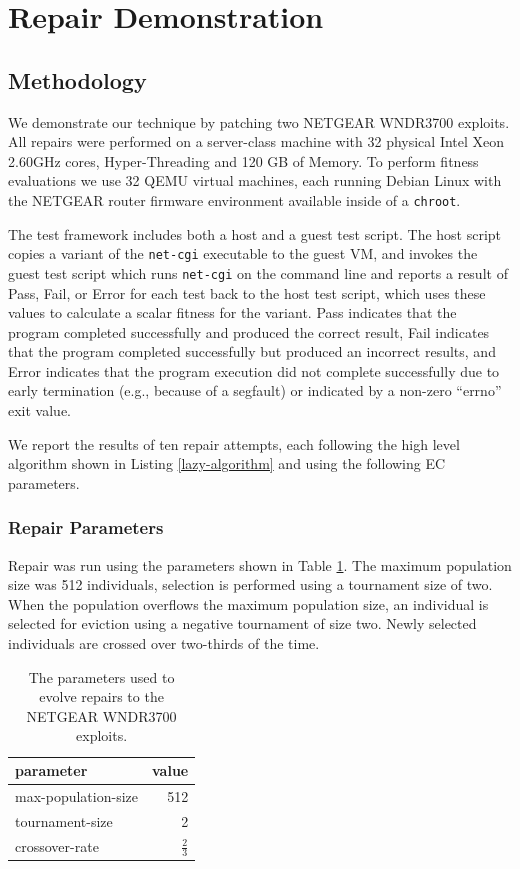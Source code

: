 \documentclass{sigcomm-alternate}
\begin{document}
\section{Repair Demonstration}
\label{sec-4}
\subsection{Methodology}
\label{sec-4-1}
We demonstrate our technique by patching two NETGEAR WNDR3700
exploits.  All repairs were performed on a server-class machine with
32 physical Intel Xeon 2.60GHz cores, Hyper-Threading and 120 GB of
Memory.  To perform fitness evaluations we use 32 QEMU virtual
machines, each running Debian Linux with the NETGEAR router firmware
environment available inside of a \texttt{chroot}.

The test framework includes both a host and a guest test script.  The
host script copies a variant of the \texttt{net-cgi} executable to the guest
VM, and invokes the guest test script which runs \texttt{net-cgi} on the
command line and reports a result of {\sc Pass}, {\sc Fail}, or 
{\sc Error} for each test back to the host test script, which uses these
values to calculate a scalar fitness for the variant.  {\sc Pass}
indicates that the program completed successfully and produced the correct
result, {\sc Fail} indicates that the program completed successfully
but produced an incorrect results, and {\sc Error} indicates that the
program execution did not complete successfully due to early
termination (e.g., because of a segfault) or indicated by a non-zero
``errno'' exit value.

We report the results of ten repair attempts, each following the high
level algorithm shown in Listing \ref{lazy-algorithm} and using the
following EC parameters. 

\subsubsection{Repair Parameters}
\label{sec-4-1-1}
Repair was run using the parameters shown in Table \ref{parameters}.  The
maximum population size was 512 individuals, selection is performed
using a tournament size of two.  When the population overflows the
maximum population size, an individual is selected for eviction using
a negative tournament of size two.  Newly selected individuals are
crossed over two-thirds of the time.

\begin{table}[htb]
\centering
\begin{tabular}{lr}
parameter           & value         \\
\hline
max-population-size & 512           \\
tournament-size     & 2             \\
crossover-rate      & $\frac{2}{3}$ \\
\end{tabular}\caption{\label{parameters}The parameters used to evolve repairs to the NETGEAR WNDR3700 exploits.}

\end{table}
\end{document}
